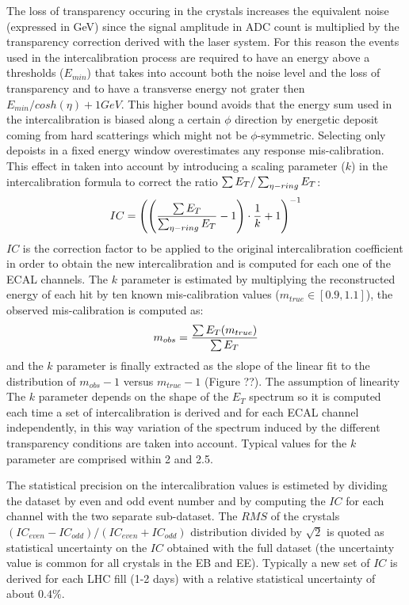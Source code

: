 The loss of transparency occuring in the crystals increases the equivalent noise (expressed in GeV) since the
signal amplitude in ADC count is multiplied by the transparency correction derived with the laser system.
For this reason the events used in the intercalibration process
are required to have an energy above a thresholds ($E_{min}$) that takes into
account both the noise level and the loss of transparency and to have a transverse energy not grater then
$E_{min}/cosh(\eta) + 1 GeV$. This higher bound avoids that the energy sum used in the intercalibration is
biased along a certain $\phi$ direction by energetic deposit coming from hard scatterings which might not be
$\phi$-symmetric.
Selecting only depoists in a fixed energy window overestimates any response mis-calibration. This effect in taken into
account by introducing a scaling parameter ($k$) in the intercalibration formula to correct the ratio $\sum E_T/\sum_{\eta-ring} E_T$:
\[
  IC = \left( \left( \frac{\sum E_T}{\sum_{\eta-ring} E_T} - 1 \right) \cdot \frac{1}{k} + 1 \right)^{-1}
\]
$IC$ is the correction factor to be applied to the original intercalibration coefficient in order to obtain the
new intercalibration and is computed for each one of the ECAL channels.
The $k$ parameter is estimated by multiplying the reconstructed energy of each hit by ten known
mis-calibration values ($m_{true} \in [0.9, 1.1]$), the observed mis-calibration is computed as:
\[
  m_{obs} = \frac{\sum E_T(m_{true})}{\sum E_T}
\]
and the $k$ parameter is finally extracted as the slope of the linear fit to the distribution of $m_{obs}-1$ versus $m_{true}-1$
(Figure ??). The assumption of linearity 
The $k$ parameter depends on the shape of the $E_T$ spectrum so it is computed each time a set of intercalibration
is derived and for each ECAL channel independently, in this way variation of the spectrum induced by the different transparency
conditions are taken into account. Typical values for the $k$ parameter are comprised within 2 and 2.5.

The statistical precision on the intercalibration values is estimeted by dividing the dataset by even and odd event number
and by computing the $IC$ for each channel with the two separate sub-dataset.
The $RMS$ of the crystals $(IC_{even}-IC_{odd})/(IC_{even}+IC_{odd})$ distribution divided by $\sqrt{2}$ is quoted as statistical
uncertainty on the $IC$ obtained with the full dataset (the uncertainty value is common for all crystals in the EB and EE).
Typically a new set of $IC$ is derived for each LHC fill (1-2 days) with a relative statistical uncertainty of about $0.4\%$.

